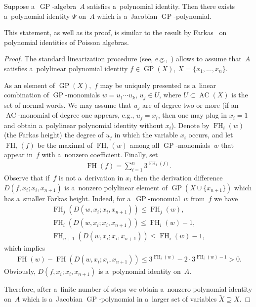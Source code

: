 \begin{proposition}
\label{prop:GPIdent:Jacobian}
Suppose a~$\operatorname{GP}$-algebra~$A$ satisfies a~polynomial identity.
Then there exists a~polynomial identity $\Psi $ on~$A$ which is a~Jacobian $\operatorname{GP}$-polynomial.
\end{proposition}

This statement, as well as its proof, is similar to the result by Farkas~\cite{FarkasI} on polynomial identities of
Poisson algebras.

\begin{proof}
The standard linearization procedure (see, e.g.,~\cite[Chapter~1]{ZSSS}) allows to assume that~$A$ satisf\/ies
a~polylinear polynomial identity $f\in \operatorname{GP}(X)$, $X=\{x_1,\dots, x_n\}$.

As an element of $\operatorname{GP}(X)$,~$f$ may be uniquely presented as a~linear combination of $\operatorname{GP}$-monomials $w=u_1\cdots u_k $,
$u_j\in U$, where $U\subset \operatorname{AC}(X)$ is the set of normal words.
We may assume that $u_j$ are of degree two or more (if an $\operatorname{AC}$-monomial of degree one appears, e.g., $u_j=x_i$, then one
may plug in $x_i=1$ and obtain a~polylinear polynomial identity without $x_i$).
Denote by $\operatorname{FH}_i(w)$ (the Farkas height) the degree of $u_j$ in which the variable $x_i$ occurs, and let $\operatorname{FH}_i(f)$ be the
maximal of $\operatorname{FH}_i(w)$ among all $\operatorname{GP}$-monomials~$w$ that appear in~$f$ with a~nonzero coef\/f\/icient.
Finally, set
\begin{gather*}
\operatorname{FH}(f) = \sum\limits_{i=1}^n 3^{\operatorname{FH}_i(f)}.
\end{gather*}
Observe that if~$f$ is not a~derivation in $x_i$ then the derivation dif\/ference $ D(f, x_i; x_i, x_{n+1}) $ is a~nonzero
polylinear element of $\operatorname{GP}(X\cup\{x_{n+1}\})$ which has a~smaller Farkas height.
Indeed, for a~$\operatorname{GP}$-monomial~$w$ from~$f$ we have
\begin{gather*}
\operatorname{FH}_j(D(w,x_i;x_i,x_{n+1}))\le \operatorname{FH}_j(w),
\\
\operatorname{FH}_{i}(D(w,x_i;x_i,x_{n+1}))\le \operatorname{FH}_i(w)-1,
\\
\operatorname{FH}_{n+1}(D(w,x_i;x_i,x_{n+1}))\le \operatorname{FH}_i(w)-1,
\end{gather*}
which implies
\begin{gather*}
\operatorname{FH}(w)-\operatorname{FH}(D(w,x_i;x_i,x_{n+1})) \le 3^{\operatorname{FH}_i(w)} - 2\cdot 3^{\operatorname{FH}_i(w)-1} >0.
\end{gather*}
Obviously, $D(f, x_i; x_i, x_{n+1})$ is a~polynomial identity on~$A$.

Therefore, after a~f\/inite number of steps we obtain a~nonzero polynomial identity on~$A$ which is a~Jacobian
$\operatorname{GP}$-polynomial in a~larger set of variables $\widetilde X\supseteq X$.
\end{proof}

